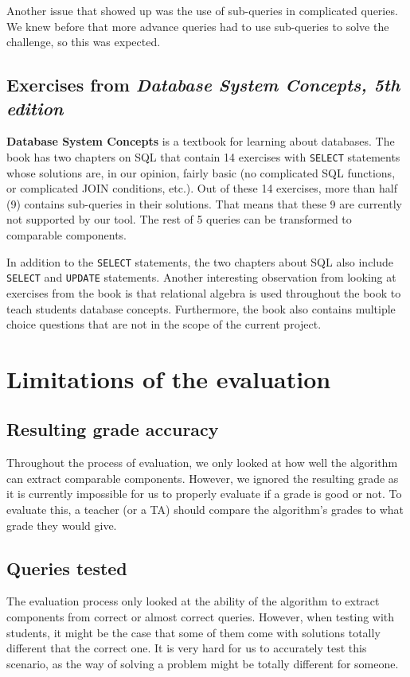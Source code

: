 Another issue that showed up was the use of sub-queries in complicated queries. We knew before that more advance queries had to use sub-queries to solve the challenge, so this was expected.

\subsection{Exercises from \textit{Database System Concepts, 5th edition}}

\textbf{Database System Concepts} is a textbook for learning about databases. The book has two chapters on SQL that contain 14 exercises with \texttt{SELECT} statements whose solutions are, in our opinion, fairly basic (no complicated SQL functions, or complicated JOIN conditions, etc.). Out of these 14 exercises, more than half (9) contains sub-queries in their solutions. That means that these 9 are currently not supported by our tool. The rest of 5 queries can be transformed to comparable components.

In addition to the \texttt{SELECT} statements, the two chapters about SQL also include \texttt{SELECT} and \texttt{UPDATE} statements. Another interesting observation from looking at exercises from the book is that relational algebra is used throughout the book to teach students database concepts. Furthermore, the book also contains multiple choice questions that are not in the scope of the current project.

\section{Limitations of the evaluation}
\subsection{Resulting grade accuracy}
Throughout the process of evaluation, we only looked at how well the algorithm can extract comparable components. However, we ignored the resulting grade as it is currently impossible for us to properly evaluate if a grade is good or not. To evaluate this, a teacher (or a TA) should compare the algorithm's grades to what grade they would give.

\subsection{Queries tested}
The evaluation process only looked at the ability of the algorithm to extract components from correct or almost correct queries. However, when testing with students, it might be the case that some of them come with solutions totally different that the correct one. It is very hard for us to accurately test this scenario, as the way of solving a problem might be totally different for someone.


